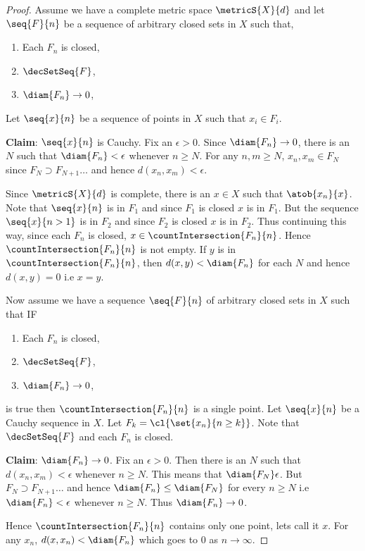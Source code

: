 \begin{proof}
    Assume we have a complete metric space $\metricS{X}{d}$ and let $\seq{F}{n}$ be a sequence of arbitrary 
    closed sets in $X$ such that,
    \begin{enumerate}
	\item
	    Each $F_n$ is closed,
	\item
	    $\decSetSeq{F}$,
	\item
	    $\diam{F_n}\to 0$,
    \end{enumerate}
    Let $\seq{x}{n}$ be a sequence of points in $X$ such that $x_i \in F_i$. 

    \textbf{Claim}: $\seq{x}{n}$ is Cauchy. Fix an $\epsilon > 0$. Since $\diam{F_n}\to 0$, there is an $N$
    such that $\diam{F_n} < \epsilon$ whenever $n \geq N$. For any $n,m \geq N$, $x_n,x_m \in F_N$ since
    $F_{N} \supset F_{N+1} \ldots$ and hence $d(x_n,x_m) < \epsilon$. 
    
    Since $\metricS{X}{d}$ is complete,
    there is an $x \in X$ such that $\atob{x_n}{x}$. Note that $\seq{x}{n}$ is in $F_1$ and since $F_1$ is
    closed $x$ is in $F_1$. But the sequence $\seq{x}{n > 1}$ is in $F_2$ and since $F_2$ is closed $x$ is in
    $F_2$. Thus continuing this way, since each $F_n$ is closed, $x \in \countIntersection{F_n}{n}$. Hence
    $\countIntersection{F_n}{n}$ is not empty. If $y$ is in $\countIntersection{F_n}{n}$, then $d(x,y) <
    \diam{F_n}$ for each $N$ and hence $d(x,y) = 0$ i.e $x = y$.  

    Now assume we have a sequence  $\seq{F}{n}$ of arbitrary closed sets in $X$ such that IF 
    \begin{enumerate}
	\item
	    Each $F_n$ is closed,
	\item
	    $\decSetSeq{F}$,
	\item
	    $\diam{F_n}\to 0$,
    \end{enumerate}
    is true then $\countIntersection{F_n}{n}$ is a single point. Let $\seq{x}{n}$ be a Cauchy sequence in $X$.
    Let $F_k = \cl{\set{x_n}{n\geq k}}$. Note that $\decSetSeq{F}$ and each $F_n$ is closed.

    \textbf{Claim}: $\diam{F_n}\to 0$. Fix an $\epsilon > 0$. Then there is an $N$ such that $d(x_n,x_m) <
    \epsilon$ whenever $n \geq N$. This means that $\diam{F_N} \epsilon$. But $F_N \supset F_{N+1} \ldots$ and
    hence $\diam{F_n} \leq \diam{F_N}$ for every $n \geq N$ i.e $\diam{F_n} < \epsilon$ whenever $n \geq N$.
    Thus $\diam{F_n}\to 0$.

    Hence $\countIntersection{F_n}{n}$ contains only one point, lets call it $x$. For any $x_n$, $d(x,x_n) <
    \diam{F_n}$ which goes to $0$ as $n\to \infty$.
\end{proof}
